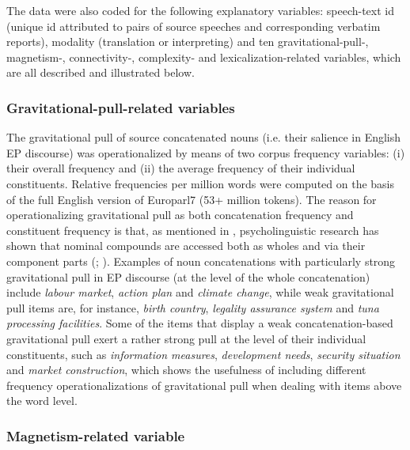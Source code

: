 \documentclass[output=paper]{langscibook}
\begin{document}
\begin{sloppypar}
The data were also coded for the following explanatory variables: speech-text id (unique id attributed to pairs of source speeches and corresponding verbatim reports), modality (translation or interpreting) and ten \mbox{gravitation\-al-pull-,} magnetism-, connectivity-, complexity- and lexicalization-related variables, which are all described and illustrated below.
\end{sloppypar}

\subsubsection{Gravitational-pull-related variables}\label{sec:lefer:3.2.1}

The gravitational pull of source concatenated nouns (i.e. their salience in English EP discourse) was operationalized by means of two corpus frequency variables: (i) their overall frequency and (ii) the average frequency of their individual constituents. Relative frequencies per million words were computed on the basis of the full English version of Europarl7 (53+ million tokens). The reason for operationalizing gravitational pull as both concatenation frequency and constituent frequency is that, as mentioned in , psycholinguistic research has shown that nominal compounds are accessed both as wholes and via their component parts (\citealt{BaayenEtAl2010}; \citealt{Gagne2011}). Examples of noun concatenations with particularly strong gravitational pull in EP discourse (at the level of the whole concatenation) include \textit{labour market}, \textit{action plan} and \textit{climate change}, while weak gravitational pull items are, for instance, \textit{birth country}, \textit{legality assurance system} and \textit{tuna processing facilities}. Some of the items that display a weak concatenation-based gravitational pull exert a rather strong pull at the level of their individual constituents, such as \textit{information measures}, \textit{development needs}, \textit{security situation} and \textit{market construction}, which shows the usefulness of including different frequency operationalizations of gravitational pull when dealing with items above the word level.


\subsubsection{Magnetism-related variable}\label{sec:lefer:3.2.2}
\end{document}
